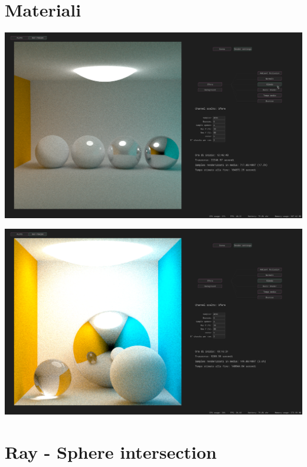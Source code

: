 \documentclass{article}
\begin{document}
\newpage
\section{Materiali}
\begin{center}
	\begin{minipage}{0.95\textwidth}
		\includegraphics*[width=\linewidth]{../images/glossy.png}
	\end{minipage}
\end{center}
\begin{center}
	\begin{minipage}{0.95\textwidth}
		\includegraphics*[width=\linewidth]{../images/glass.png}
	\end{minipage}
\end{center}


\newpage
\section{Ray - Sphere intersection}
\end{document}
